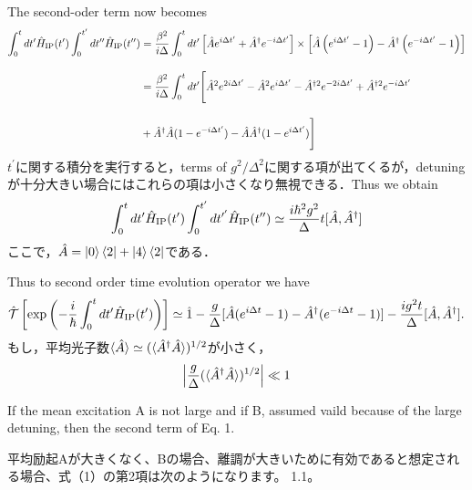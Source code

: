 The second-oder term now becomes
\begin{align}
    \int_0^{t}dt^\prime \hat{H}_{\rm{IP}}(t^\prime)
    \int_0^{t^\prime}dt^{\prime\prime} \hat{H}_{\rm{IP}}(t^{\prime\prime})
    &=\frac{\beta^2}{i\Delta}\int_0^{t}dt^\prime
    \left[
    \hat{A}e^{i\Delta t^\prime}
    +\hat{A}^\dagger e^{-i\Delta t^\prime}
    \right]
    \times
    \left[
    \hat{A}
    \left(e^{i\Delta t^\prime}-1\right)
    -\hat{A}^\dagger\left(e^{-i\Delta t^\prime}-1\right)
    \right]\nn[10pt]
    &=\frac{\beta^2}{i\Delta}\int_0^{t}dt^\prime
    \Biggl[
    \hat{A}^2e^{2i\Delta t^\prime}
    -\hat{A}^2e^{i\Delta t^\prime}
    -\hat{A}^{\dagger2}e^{-2i\Delta t^\prime}
    +\hat{A}^{\dagger2}e^{-i\Delta t^\prime}\nn[10pt]
    &
    +\hat{A}^{\dagger}\hat{A}(1-e^{-i\Delta t^\prime})
    -\hat{A}\hat{A}^{\dagger}(1-e^{i\Delta t^\prime})
    \Biggr]
\end{align}
$t^\prime$に関する積分を実行すると，terms of $g^2/\Delta^2$に関する項が出てくるが，detuningが十分大きい場合にはこれらの項は小さくなり無視できる．Thus we obtain 
\begin{align}
    \int_0^{t}dt^\prime \hat{H}_{\rm{IP}}(t^\prime)
    \int_0^{t^\prime}dt^{\prime^\prime} \hat{H}_{\rm{IP}}(t^{\prime\prime})
    \simeq\frac{i\hbar^2g^2}{\Delta}t[\hat{A}, \hat{A}^\dagger]
\end{align}
ここで，$\hat{A}=\ket{0}\bra{2} + \ket{4}\bra{2}$である．


 Thus to second order time evolution operator we have
\begin{equation}
    \hat{\mathcal{T}}\left[
    \exp{\left(
    -\frac{i}{\hbar}\int_0^t dt^\prime \hat{H}_{\rm{IP}}(t^\prime)
    \right)}
    \right]
    \simeq
    \hat{1}-\frac{g}{\Delta}[\hat{A}(e^{i\Delta t}-1)-\hat{A}^\dagger(e^{-i\Delta t}-1)]
    -\frac{ig^2t}{\Delta}[\hat{A},\hat{A}^\dagger].
\end{equation}
もし，平均光子数$\braket{\hat{A}}\simeq(\braket{\hat{A}^\dag\hat{A}})^{1/2}$が小さく，
\begin{equation}
    \left|
    \frac{g}{\Delta}(\braket{\hat{A}^\dag\hat{A}})^{1/2}
    \right|\ll1
\end{equation}

If the mean excitation A is not large and if B, assumed vaild because of the large detuning, then the second term of Eq. 1.



平均励起Aが大きくなく、Bの場合、離調が大きいために有効であると想定される場合、式（1）の第2項は次のようになります。 1.1。

